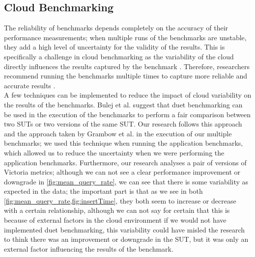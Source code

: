 \subsection{Cloud Benchmarking}
The reliability of benchmarks depends completely on the accuracy of their performance measurements; when multiple runs of the benchmarks are unstable, they add a high level of uncertainty for the validity of the results. This is specifically a challenge in cloud benchmarking as the variability of the cloud directly influences the results captured by the benchmark \cite{laaber2018evaluationofopensourcesoftware,folkerts2012benchmarking,bulej2019initial,bulej2020duet,bermbach2017quality,leitnerPatternsinthechaos}. Therefore, researchers recommend running the benchmarks multiple times to capture more reliable and accurate results \cite{japke2023earlymicrobenchmarkcatches, scheuner2018cloudBenchmarkingSuit, abedi2017conductingrepeatable, grambow}. \\
A few techniques can be implemented to reduce the impact of cloud variability on the results of the benchmarks. Bulej et al. \cite{bulej2020duet} suggest that duet benchmarking can be used in the execution of the benchmarks to perform a fair comparison between two \ac{SUT}s or two versions of the same \ac{SUT}. Our research follows this approach and the approach taken by Grambow et al. \cite{grambow} in the execution of our multiple benchmarks; we used this technique when running the application benchmarks, which allowed us to reduce the uncertainty when we were performing the application benchmarks. Furthermore, our research analyses a pair of versions of Victoria metrics; although we can not see a clear performance improvement or downgrade in \cref{fig:mean_query_rate}, we can see that there is some variability as expected in the data; the important part is that as we see in both \cref{fig:mean_query_rate,fig:insertTime}, they both seem to increase or decrease with a certain relationship, although we can not say for certain that this is because of external factors in the cloud environment if we would not have implemented duet benchmarking, this variability could have misled the research to think there was an improvement or downgrade in the \ac{SUT}, but it was only an external factor influencing the results of the benchmark.   